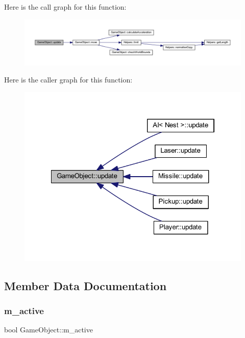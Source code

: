 Here is the call graph for this function\+:
\nopagebreak
\begin{figure}[H]
\begin{center}
\leavevmode
\includegraphics[width=350pt]{class_game_object_a2fece397b6343682d639f8943f124d0e_cgraph}
\end{center}
\end{figure}
Here is the caller graph for this function\+:
\nopagebreak
\begin{figure}[H]
\begin{center}
\leavevmode
\includegraphics[width=322pt]{class_game_object_a2fece397b6343682d639f8943f124d0e_icgraph}
\end{center}
\end{figure}


\subsection{Member Data Documentation}
\mbox{\label{class_game_object_a65307073834455243a8b339592245603}} 
\subsubsection{\texorpdfstring{m\+\_\+active}{m\_active}}
{\footnotesize\ttfamily bool Game\+Object\+::m\+\_\+active\hspace{0.3cm}{\ttfamily [protected]}}

